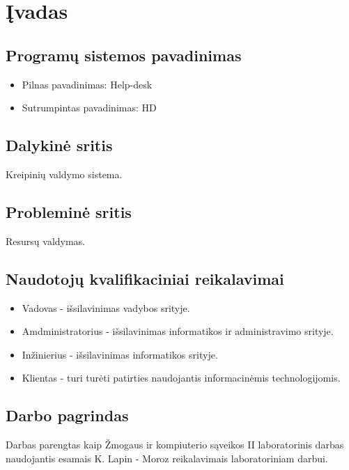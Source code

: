 \section{Įvadas}
	
	\subsection{Programų sistemos pavadinimas}
	
	\begin{itemize}
	\item Pilnas pavadinimas: Help-desk
	\item Sutrumpintas pavadinimas: HD
	\end{itemize}
	
	\subsection{Dalykinė sritis}
	
	Kreipinių valdymo sistema.
	
	\subsection{Probleminė sritis}
	
	Resursų valdymas.
	
	\subsection{Naudotojų kvalifikaciniai reikalavimai}
	
	\begin{itemize}
	\item Vadovas - išsilavinimas vadybos srityje.
	\item Amdministratorius - išsilavinimas informatikos ir administravimo srityje.
	\item Inžinierius - išsilavinimas informatikos srityje.
	\item Klientas - turi turėti patirties naudojantis informacinėmis technologijomis.
	\end{itemize}
	
	\subsection{Darbo pagrindas}
	
	Darbas parengtas kaip Žmogaus ir kompiuterio sąveikos II laboratorinis darbas naudojantis esamais K. Lapin - Moroz reikalavimais laboratoriniam darbui.
	
